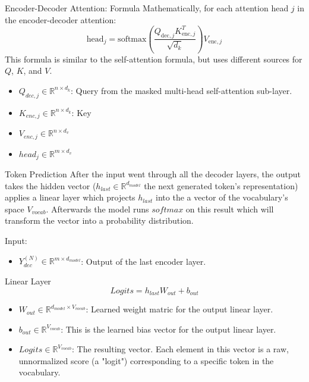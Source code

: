 \documentclass{beamer}
\begin{document}
\begin{frame}{Encoder-Decoder Attention: Formula}
    Mathematically, for each attention head $j$ in the encoder-decoder attention:
    $$ \text{head}_j = \text{softmax}\left(\frac{Q_{\text{dec},j}K_{\text{enc},j}^T}{\sqrt{d_k}}\right)V_{\text{enc},j} $$
    This formula is similar to the self-attention formula, but uses different sources for $Q$, $K$, and $V$.

    \begin{itemize}
      \item $Q_{dec, j} \in \mathbb{R}^{n \times d_k}$: Query from the masked multi-head self-attention sub-layer.
      \item $K_{enc, j} \in \mathbb{R}^{n \times d_k}$: Key 
      \item $V_{enc, j} \in \mathbb{R}^{n \times d_v}$
      \item $head_j \in \mathbb{R}^{m \times d_v}$
    \end{itemize}
\end{frame}

\begin{frame}{Token Prediction}
  After the input went through all the decoder layers, the output takes the hidden vector ($h_{last} \in \mathbb{R}^{d_{model}}$ the next generated token's representation) applies a linear layer
  which projects $h_{last}$ into the a vector of the vocabulary's space $V_{vocab}$. Afterwards the model runs $softmax$ on this
  result which will transform the vector into a probability distribution.

  Input:
  \begin{itemize}
    \item $Y^{(N)}_{dec} \in \mathbb{R}^{m \times d_{model}}$: Output of the last encoder layer.
  \end{itemize}
\end{frame}

\begin{frame}{Linear Layer}
  $$Logits = h_{last}W_{out}+b_{out}$$

  \begin{itemize}
    \item $W_{out} \in \mathbb{R}^{d_{model} \times V_{vocab}}$: Learned weight matric for the output linear layer.
    \item $b_{out} \in \mathbb{R}^{V_{vocab}}$: This is the learned bias vector for the output linear layer.
    \item $Logits \in \mathbb{R}^{V_{vocab}}$: The resulting vector. Each element in this vector is a raw, unnormalized score (a "logit") corresponding to a specific token in the vocabulary.
  \end{itemize}
\end{frame}
\end{document}
